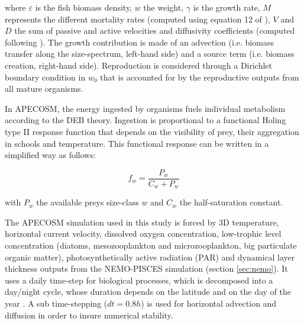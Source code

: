 where $\varepsilon$  is the fish biomass density, $w$ the weight, $\gamma$ is the growth rate, $M$ represents the different mortality rates (computed using equation 12 of \citealt{mauryIndividualsPopulationsCommunities2013}), $V$ and $D$ the sum of passive and active velocities and diffusivity coefficients (computed following \citealt{faugerasAdvectiondiffusionreactionSizestructuredFish2005}). The growth contribution is made of an advection (i.e. biomass transfer along the size-spectrum, left-hand side) and a source term (i.e. biomass creation, right-hand side). Reproduction is considered through a Dirichlet boundary condition in $w_0$ that is accounted for by the reproductive outputs from all mature organisms.

In APECOSM, the energy ingested by organisms fuels individual metabolism according to the DEB theory. Ingestion is proportional to a functional Holing type II response function that depends on the visibility of prey, their aggregation in schools and temperature. This functional response can be written in a simplified way as follows:

\begin{displaymath}
f_{w} = \frac{P_{w}}{C_{w} + P_{w}}
\end{displaymath}

with $P_{w}$ the available preys size-class $w$ and $C_{w}$ the half-saturation constant.



The APECOSM simulation used in this study is forced by 3D temperature, horizontal current velocity, dissolved oxygen concentration, low-trophic level concentration (diatoms, mesozooplankton and microzooplankton, big particulate organic matter), photosynthetically active radiation (PAR) and dynamical layer thickness outputs from the NEMO-PISCES simulation (section \ref{sec:nemo}). It uses a daily time-step for biological processes, which is decomposed into a day/night cycle, whose duration depends on the latitude and on the day of the year \citep{forsytheModelComparisonDaylength1995}. A sub time-stepping ($dt =0.8h$) is used for horizontal advection and diffusion in order to insure numerical stability.

